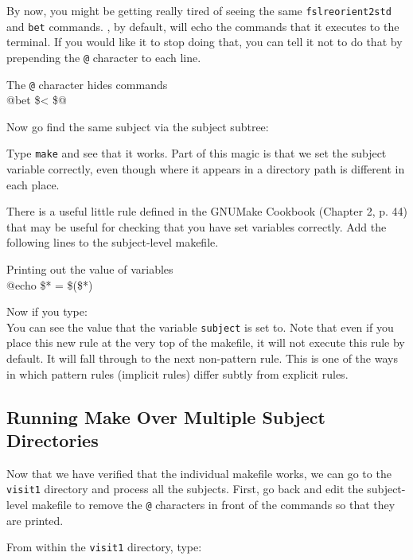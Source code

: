 By now, you might be getting really tired of seeing the same \texttt{fslreorient2std} and \texttt{bet} commands. \maken{}, by default,
will echo the commands that it executes to the terminal. If you would
like it to stop doing that, you can tell it not to do that by
prepending the \texttt{@} character to each line.
\begin{make}{The \texttt{@} character hides commands}{}
\\
  \tab @bet \$< \$@
\end{make}

Now go find the same subject via the subject subtree:

Type \texttt{make} and see that it works. Part of this magic is that we set
the subject variable correctly, even though where it appears in a
directory path is different in each place.

There is a useful little rule defined in the GNUMake Cookbook (Chapter
2, p. 44) that may be useful for checking that you have set variables correctly. Add the following lines to the subject-level makefile.


\begin{make}{Printing out the value of variables}{}
\\
\tab @echo \$* = \$(\$*)
\end{make}

Now if you type:  \\
You can see the value that the variable \texttt{subject} is set to. Note that even if you place this new rule at the very top of the makefile, it will not execute this rule by default. It will fall through to the next non-pattern rule. This is one of the ways in which pattern rules (implicit rules) differ subtly from explicit rules. 


\subsection{Running Make Over Multiple Subject Directories}
Now that we have verified that the individual makefile works, we can
go to the \texttt{visit1} directory and process all the
subjects. First, go back and edit the subject-level makefile to remove
the \texttt{@} characters in front of the commands so that they are
printed.

From within the \texttt{visit1} directory, type:

